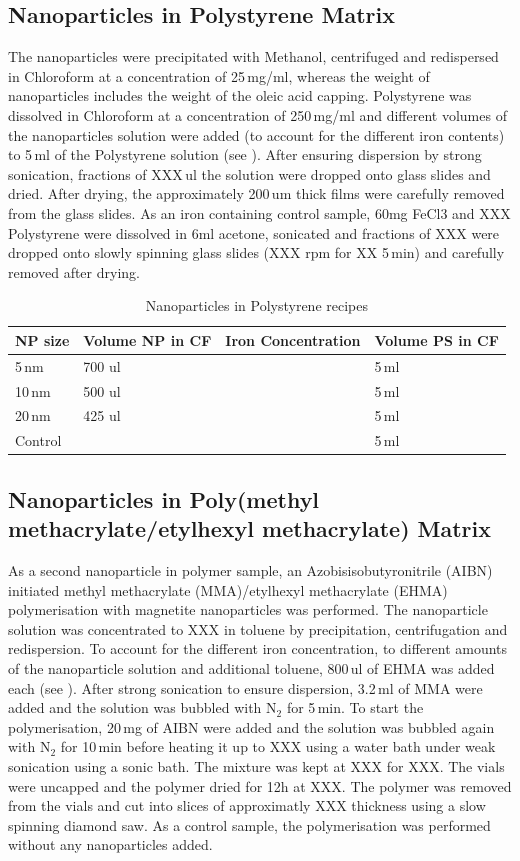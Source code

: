 \subsection{Nanoparticles in Polystyrene Matrix}
The nanoparticles were precipitated with Methanol, centrifuged and redispersed in Chloroform at a concentration of 25\,mg/ml, whereas the weight of nanoparticles includes the weight of the oleic acid capping. Polystyrene was dissolved in Chloroform at a concentration of 250\,mg/ml and different volumes of the nanoparticles solution were added (to account for the different iron contents) to 5\,ml of the Polystyrene solution (see ). After ensuring dispersion by strong sonication, fractions of XXX\,ul the solution were dropped onto glass slides and dried. After drying, the approximately 200\,um thick films were carefully removed from the glass slides.
As an iron containing control sample, 60mg FeCl3 and XXX Polystyrene were dissolved in 6ml acetone, sonicated and  fractions of XXX were dropped onto slowly spinning glass slides (XXX rpm for XX 5\,min) and carefully removed after drying.
\begin{table}[tp]
	\centering
	\caption{Nanoparticles in Polystyrene recipes}
	\label{tab:samplePS}
	\begin{tabular}{llll}
		\hline
	NP size&   Volume NP in CF &  Iron Concentration &Volume PS in CF    \\
		\hline
	  5\,nm&700 ul & & 5\,ml  \\  
	   10\,nm&  500 ul& &5\,ml  \\    
	   20\,nm &  425 ul& &5\,ml  \\  
	   	Control   &  & &5\,ml  \\  
		\hline
	\end{tabular}
\end{table}

\subsection{Nanoparticles in Poly(methyl methacrylate/etylhexyl methacrylate)  Matrix}
As a second nanoparticle in polymer sample, an Azobisisobutyronitrile (AIBN) initiated methyl methacrylate (MMA)/etylhexyl methacrylate (EHMA) polymerisation with magnetite nanoparticles was performed. 
The nanoparticle solution was concentrated to XXX in toluene by precipitation, centrifugation and redispersion. To account for the different iron concentration, to different amounts of the nanoparticle solution and additional toluene, 800\,ul of EHMA was added each (see ). After strong sonication to ensure dispersion, 3.2\,ml of MMA were added and the solution was bubbled with N$_2$ for 5\,min. To start the polymerisation, 20\,mg of AIBN were added and the solution was bubbled again with N$_2$  for 10\,min before heating it up to XXX using a water bath under weak sonication using a sonic bath. The mixture was kept at XXX for XXX.
The vials were uncapped and the polymer dried for 12h at XXX. The polymer was removed from the vials and cut into slices of approximatly XXX thickness using a slow spinning diamond saw.
As a control sample, the polymerisation was performed without any nanoparticles added.

